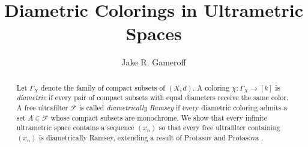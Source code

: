 
\makeatletter
\def\@settitle{\begin{center}%
  \baselineskip14\p@\relax
    \normalfont\Large%
\@title
  \end{center}%
}
\makeatother

\title{Diametric Colorings in Ultrametric Spaces}
\author{Jake R. Gameroff}

\begin{abstract}
	Let \(\Gamma_X\) denote the family of compact subsets of $(X,d)$. A coloring \(\chi : \Gamma_X \to [k] \) is \emph{diametric} if every pair of compact subsets with equal diameters receive the same color. A free ultrafilter \( \mathcal{F}  \) is called \emph{diametrically Ramsey} if every diametric coloring admits a set $A \in \mathcal{F}$ whose compact subsets are monochrome. We show that every infinite ultrametric space contains a sequence $(x_n)$ so that every free ultrafilter containing $(x_n)$ is diametrically Ramsey, extending a result of Protasov and Protasova \cite{protasov:2017}.
\end{abstract}
\maketitle










